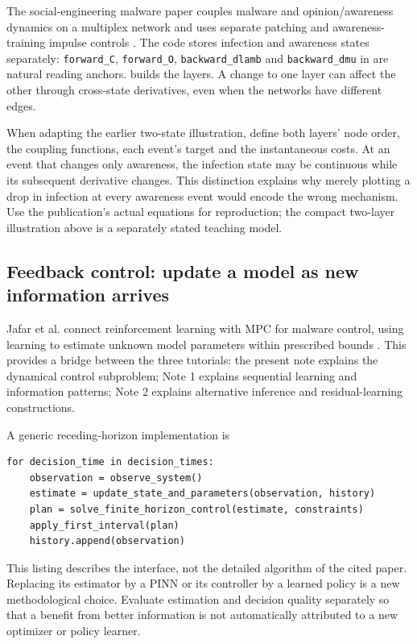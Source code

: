 \documentclass[11pt,a4paper]{article}
\theoremstyle{definition}
\theoremstyle{remark}
\begin{document}
The social-engineering malware paper couples malware and opinion/awareness dynamics on a multiplex network and uses separate patching and awareness-training impulse controls \cite{malware2025}. The code stores infection and awareness states separately: \texttt{forward\_C}, \texttt{forward\_O}, \texttt{backward\_dlamb} and \texttt{backward\_dmu} in  are natural reading anchors.  builds the layers. A change to one layer can affect the other through cross-state derivatives, even when the networks have different edges.

When adapting the earlier two-state illustration, define both layers' node order, the coupling functions, each event's target and the instantaneous costs. At an event that changes only awareness, the infection state may be continuous while its subsequent derivative changes. This distinction explains why merely plotting a drop in infection at every awareness event would encode the wrong mechanism. Use the publication's actual equations for reproduction; the compact two-layer illustration above is a separately stated teaching model.

\subsection{Feedback control: update a model as new information arrives}
Jafar et al. connect reinforcement learning with MPC for malware control, using learning to estimate unknown model parameters within prescribed bounds \cite{feedback2024}. This provides a bridge between the three tutorials: the present note explains the dynamical control subproblem; Note 1 explains sequential learning and information patterns; Note 2 explains alternative inference and residual-learning constructions.

A generic receding-horizon implementation is
\begin{lstlisting}[caption={An estimation--control loop; the estimator is application-specific}]
for decision_time in decision_times:
    observation = observe_system()
    estimate = update_state_and_parameters(observation, history)
    plan = solve_finite_horizon_control(estimate, constraints)
    apply_first_interval(plan)
    history.append(observation)
\end{lstlisting}
This listing describes the interface, not the detailed algorithm of the cited paper. Replacing its estimator by a PINN or its controller by a learned policy is a new methodological choice. Evaluate estimation and decision quality separately so that a benefit from better information is not automatically attributed to a new optimizer or policy learner.
\end{document}
